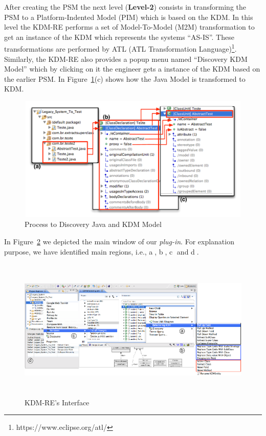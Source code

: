 After creating the PSM the next level (\textbf{Level-2}) consists in transforming the PSM to a Platform-Indented Model (PIM) which is based on the KDM. 
In this level the KDM-RE performs a set of  Model-To-Model (M2M) transformation to get an instance of the KDM which represents the systems ``AS-IS''. 
These transformations are performed by ATL (ATL Transformation Language)\footnote{https://www.eclipse.org/atl/}.
Similarly, the KDM-RE also provides a popup menu named ``Discovery KDM Model'' which by clicking on it the engineer gets a instance of the KDM based on the earlier PSM.
In Figure~\ref{fig:discovery_java_model}(c) shows how the Java Model is transformed to KDM.
%
\begin{figure}[!ht]
\centering
  \includegraphics[width=13cm, height=6cm]{figure/GerandoTODOS}
\caption{Process to Discovery Java and KDM Model}
\label{fig:discovery_java_model}
\end{figure}
%
In Figure~\ref{fig:interface} we depicted the main window of our \textit{plug-in}. 
For explanation purpose, we have identified main regions, i.e., \textcircled{a}, \textcircled{b}, \textcircled{c} and \textcircled{d}.

\begin{figure}[!ht]
\centering
  \includegraphics[width=15cm, height=6.8cm]{figure/ScreenShot_tool}
\caption{KDM-RE's Interface}
\label{fig:interface}
\end{figure}

